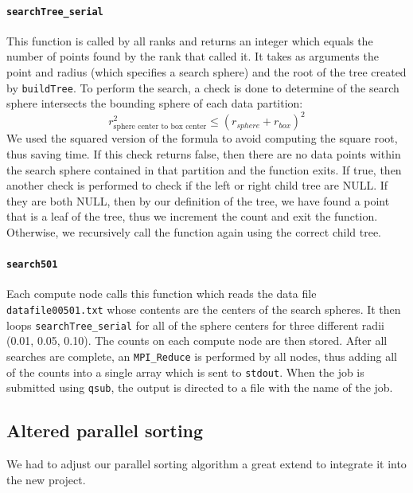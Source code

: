 \documentclass{article}
\begin{document}
\paragraph{\texttt{searchTree\_serial}}
This function is called by all ranks and returns an integer which equals the number of points found by the rank that called it. It takes as arguments the point and radius (which specifies a search sphere) and the root of the tree created by \texttt{buildTree}. To perform the search, a check is done to determine of the search sphere intersects the bounding sphere of each data partition:
\begin{equation}
		r^2_\textrm{sphere center to box center} \le (r_{sphere} + r_{box})^2
\end{equation}
We used the squared version of the formula to avoid computing the square root, thus saving time. If this check returns false, then there are no data points within the search sphere contained in that partition and the function exits. If true, then another check is performed to check if the left or right child tree are NULL. If they are both NULL, then by our definition of the tree, we have found a point that is a leaf of the tree, thus we increment the count and exit the function. Otherwise, we recursively call the function again using the correct child tree.

%
%

\paragraph{\texttt{search501}}
%
%

Each compute node calls this function which reads the data file \texttt{datafile00501.txt} whose contents are the centers of the search spheres. It then loops \texttt{searchTree\_serial} for all of the sphere centers for three different radii (0.01, 0.05, 0.10). The counts on each compute node are then stored. After all searches are complete, an \texttt{MPI\_Reduce} is performed by all nodes, thus adding all of the counts into a single array which is sent to \texttt{stdout}. When the job is submitted using \texttt{qsub}, the output is directed to a file with the name of the job.


\subsection{Altered parallel sorting}
We had to adjust our parallel sorting algorithm a great extend to integrate it into the new project.
\end{document}
